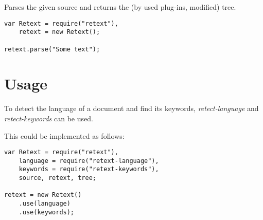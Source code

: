 Parses the given source and returns the (by used plug-ins, modified) tree.

\begin{lstlisting}
var Retext = require("retext"),
    retext = new Retext();

retext.parse("Some text");
\end{lstlisting}

\section*{Usage}

To detect the language of a document and find its keywords,
  \emph{retect-language} and \emph{retect-keywords} can be used.

This could be implemented as follows:

\begin{lstlisting}
var Retext = require("retext"),
    language = require("retext-language"),
    keywords = require("retext-keywords"),
    source, retext, tree;

retext = new Retext()
    .use(language)
    .use(keywords);


\end{lstlisting}
